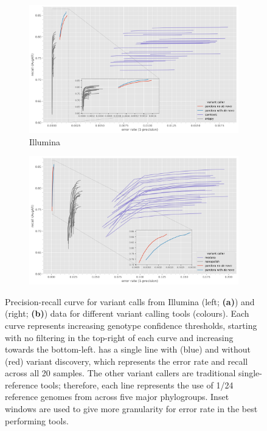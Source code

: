 \begin{figure}
     \begin{subfigure}[b]{0.475\textwidth}
        \includegraphics[width=1\linewidth]{Chapter1/Figs/illumina_roc.png}
        \centering
        \caption{Illumina}
        \label{fig:pandora-roc-illumina}
     \end{subfigure}
     \begin{subfigure}[b]{0.475\textwidth}
         \centering
        \includegraphics[width=1\linewidth]{Chapter1/Figs/nanopore_roc.png}
         \caption{\ont{}}
         \label{fig:pandora-roc-ont}
     \end{subfigure}
    \caption{Precision-recall curve for variant calls from Illumina (left; \textbf{(a)}) and \ont{} (right; \textbf{(b)}) data for different variant calling tools (colours). Each curve represents increasing genotype confidence thresholds, starting with no filtering in the top-right of each curve and increasing towards the bottom-left. \pandora{} has a single line with (blue) and without (red) \denovo{} variant discovery, which represents the error rate and recall across all 20 samples. The other variant callers are traditional single-reference tools; therefore, each line represents the use of 1/24 reference genomes from across five major \ecoli{} phylogroups. Inset windows are used to give more granularity for error rate in the best performing tools.}
        \label{fig:pandora-roc}
\end{figure}

